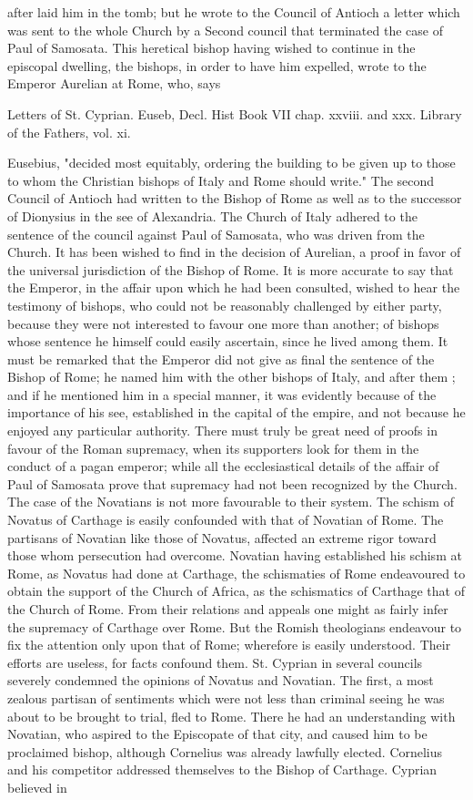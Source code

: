 after laid him in the tomb; but he wrote to the Council of Antioch a letter which was sent to the whole Church by a Second council that terminated the case of Paul of Samosata. This heretical bishop having wished to continue in the episcopal dwelling, the bishops, in order to have him expelled, wrote to the Emperor Aurelian at Rome, who, says

Letters of St. Cyprian. Euseb, Decl. Hist Book VII chap. xxviii. and xxx. Library of the Fathers, vol. xi.

Eusebius, "decided most equitably, ordering the building to be given up to those to whom the Christian bishops of Italy and Rome should write." The second Council of Antioch had written to the Bishop of Rome as well as to the successor of Dionysius in the see of Alexandria. The Church of Italy adhered to the sentence of the council against Paul of Samosata, who was driven from the Church. It has been wished to find in the decision of Aurelian, a proof in favor of the universal jurisdiction of the Bishop of Rome. It is more accurate to say that the Emperor, in the affair upon which he had been consulted, wished to hear the testimony of bishops, who could not be reasonably challenged by either party, because they were not interested to favour one more than another; of bishops whose sentence he himself could easily ascertain, since he lived among them. It must be remarked that the Emperor did not give as final the sentence of the Bishop of Rome; he named him with the other bishops of Italy, and after them ; and if he mentioned him in a special manner, it was evidently because of the importance of his see, established in the capital of the empire, and not because he enjoyed any particular authority. There must truly be great need of proofs in favour of the Roman supremacy, when its supporters look for them in the conduct of a pagan emperor; while all the ecclesiastical details of the affair of Paul of Samosata prove that supremacy had not been recognized by the Church. The case of the Novatians is not more favourable to their system. The schism of Novatus of Carthage is easily confounded with that of Novatian of Rome. The partisans of Novatian like those of Novatus, affected an extreme rigor toward those whom persecution had overcome. Novatian having established his schism at Rome, as Novatus had done at Carthage, the schismaties of Rome endeavoured to obtain the support of the Church of Africa, as the schismatics of Carthage that of the Church of Rome. From their relations and appeals one might as fairly infer the supremacy of Carthage over Rome. But the Romish theologians endeavour to fix the attention only upon that of Rome; wherefore is easily understood. Their efforts are useless, for facts confound them. St. Cyprian in several councils severely condemned the opinions of Novatus and Novatian. The first, a most zealous partisan of sentiments which were not less than criminal seeing he was about to be brought to trial, fled to Rome. There he had an understanding with Novatian, who aspired to the Episcopate of that city, and caused him to be proclaimed bishop, although Cornelius was already lawfully elected. Cornelius and his competitor addressed themselves to the Bishop of Carthage. Cyprian believed in 